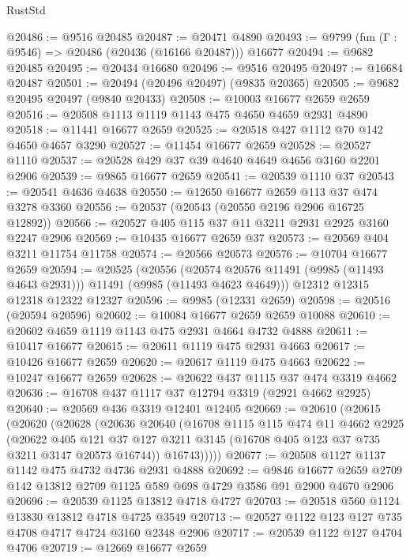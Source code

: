 \begin{lexlean}{RustStd}
\begin{coremodule}
@20486 := @9516 @20485
@20487 := @20471 @4890
@20493 := @9799 (fun (Γ : @9546) => @20486 (@20436 (@16166 @20487))) @16677
@20494 := @9682 @20485
@20495 := @20434 @16680
@20496 := @9516 @20495
@20497 := @16684 @20487
@20501 := @20494 (@20496 @20497) (@9835 @20365)
@20505 := @9682 @20495 @20497 (@9840 @20433)
@20508 := @10003 @16677 @2659 @2659
@20516 := @20508 @1113 @1119 @1143 @475 @4650 @4659 @2931 @4890
@20518 := @11441 @16677 @2659
@20525 := @20518 @427 @1112 @70 @142 @4650 @4657 @3290
@20527 := @11454 @16677 @2659
@20528 := @20527 @1110
@20537 := @20528 @429 @37 @39 @4640 @4649 @4656 @3160 @2201 @2906
@20539 := @9865 @16677 @2659
@20541 := @20539 @1110 @37
@20543 := @20541 @4636 @4638
@20550 := @12650 @16677 @2659 @113 @37 @474 @3278 @3360
@20556 := @20537 (@20543 (@20550 @2196 @2906 @16725 @12892))
@20566 := @20527 @405 @115 @37 @11 @3211 @2931 @2925 @3160 @2247 @2906
@20569 := @10435 @16677 @2659 @37
@20573 := @20569 @404 @3211 @11754 @11758
@20574 := @20566 @20573
@20576 := @10704 @16677 @2659
@20594 := @20525
    (@20556 (@20574 @20576 @11491 (@9985 (@11493 @4643 @2931))) @11491 (@9985 (@11493 @4623 @4649)))
    @12312
    @12315
    @12318
    @12322
    @12327
@20596 := @9985 (@12331 @2659)
@20598 := @20516 (@20594 @20596)
@20602 := @10084 @16677 @2659 @2659 @10088
@20610 := @20602 @4659 @1119 @1143 @475 @2931 @4664 @4732 @4888
@20611 := @10417 @16677
@20615 := @20611 @1119 @475 @2931 @4663
@20617 := @10426 @16677 @2659
@20620 := @20617 @1119 @475 @4663
@20622 := @10247 @16677 @2659
@20628 := @20622 @437 @1115 @37 @474 @3319 @4662
@20636 := @16708 @437 @1117 @37 @12794 @3319 (@2921 @4662 @2925)
@20640 := @20569 @436 @3319 @12401 @12405
@20669 := @20610
    (@20615
      (@20620
        (@20628
          (@20636
            @20640
            (@16708
              @1115
              @115
              @474
              @11
              @4662
              @2925
              (@20622
                @405
                @121
                @37
                @127
                @3211
                @3145
                (@16708 @405 @123 @37 @735 @3211 @3147 @20573 @16744))
              @16743)))))
@20677 := @20508 @1127 @1137 @1142 @475 @4732 @4736 @2931 @4888
@20692 := @9846
    @16677
    @2659
    @2709
    @142
    @13812
    @2709
    @1125
    @589
    @698
    @4729
    @3586
    @91
    @2900
    @4670
    @2906
@20696 := @20539 @1125 @13812 @4718 @4727
@20703 := @20518 @560 @1124 @13830 @13812 @4718 @4725 @3549
@20713 := @20527 @1122 @123 @127 @735 @4708 @4717 @4724 @3160 @2348 @2906
@20717 := @20539 @1122 @127 @4704 @4706
@20719 := @12669 @16677 @2659

\end{coremodule}
\end{lexlean}
